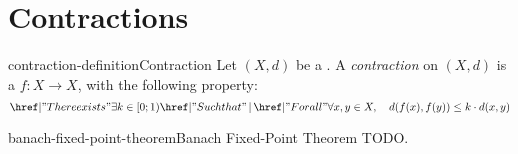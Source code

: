 \documentclass[preview]{standalone}
\begin{document}
\section{Contractions}

\begin{snippetdefinition}{contraction-definition}{Contraction}
    Let \((X, d)\) be a \metricspace.
    A \textit{contraction} on \((X, d)\) is a \function \(f\colon X \to X\),
    with the following property:
    \[
        \exists k \in [0;1) \suchthat \forall x,y \in X, \quad d(f(x), f(y)) \leq k\cdot d(x,y)
    \]
\end{snippetdefinition}


\begin{snippettheorem}{banach-fixed-point-theorem}{Banach Fixed-Point Theorem}
    TODO.
\end{snippettheorem}
\end{document}
